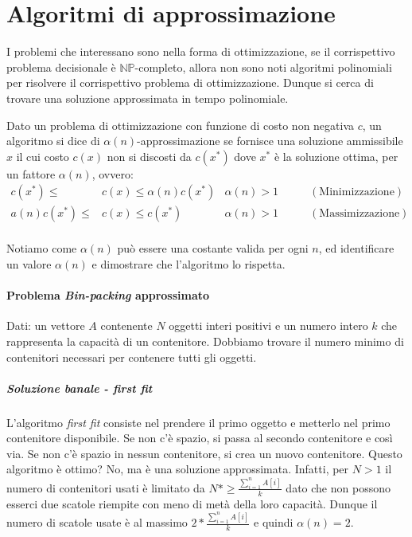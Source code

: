 \section{Algoritmi di approssimazione}
    I problemi che interessano sono nella forma di ottimizzazione, se il corrispettivo problema decisionale è $\mathbb{NP}$-completo, allora non sono noti algoritmi polinomiali per risolvere il corrispettivo problema di ottimizzazione. Dunque si cerca di trovare una soluzione approssimata in tempo polinomiale. 
    \begin{definition}[approssimazione]
        Dato un problema di ottimizzazione con funzione di costo non negativa $c$, un algoritmo si dice di $\alpha(n)$-approssimazione se fornisce una soluzione ammissibile $x$ il cui costo $c(x)$ non si discosti da $c(x^*)$ dove $x^*$ è la soluzione ottima, per un fattore $\alpha(n)$, ovvero:
        \begin{align*}
            c(x^*) \leq & c(x) \leq \alpha(n) c(x^*) & \alpha(n) > 1\qquad& (\text{Minimizzazione})\\
            a(n)c(x^*) \leq & c(x) \leq c(x^*) & \alpha(n) > 1\qquad& (\text{Massimizzazione})\\
        \end{align*}
    \end{definition}
    Notiamo come $\alpha(n)$ può essere una costante valida per ogni $n$, ed identificare un valore $\alpha(n)$ e dimostrare che l'algoritmo lo rispetta.
    \paragraph{Problema \textit{Bin-packing} approssimato} 
        Dati: un vettore $A$ contenente $N$ oggetti interi positivi e un numero intero $k$ che rappresenta la capacità di un contenitore. Dobbiamo trovare il numero minimo di contenitori necessari per contenere tutti gli oggetti.
        \subparagraph{Soluzione banale - \textit{first fit}} 
            L'algoritmo \textit{first fit} consiste nel prendere il primo oggetto e metterlo nel primo contenitore disponibile. Se non c'è spazio, si passa al secondo contenitore e così via. Se non c'è spazio in nessun contenitore, si crea un nuovo contenitore.\newline
            Questo algoritmo è ottimo? No, ma è una soluzione approssimata. Infatti, per $N>1$ il numero di contenitori usati è limitato da $N*\geq \frac{\sum_{i=1}^nA[i]}{k}$ dato che non possono esserci due scatole riempite con meno di metà della loro capacità. Dunque il numero di scatole usate è al massimo $2*\frac{\sum_{i=1}^nA[i]}{k}$ e quindi $\alpha(n)=2$.
